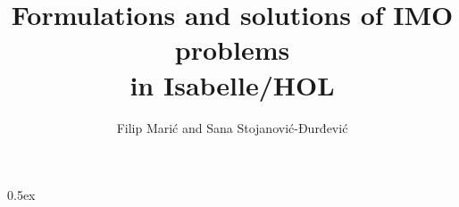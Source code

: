 \documentclass[12pt, aa4paper]{book}
\theoremstyle{definition}
\begin{document}
\title{Formulations and solutions of IMO problems \\in Isabelle/HOL}
\author{Filip Marić and Sana Stojanović-Đurđević}
\maketitle

\tableofcontents

\parindent 0pt\parskip 0.5ex



%
%
\end{document}
